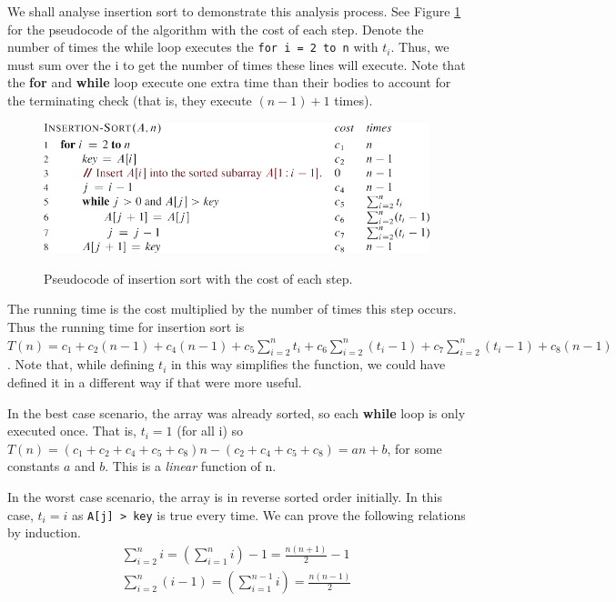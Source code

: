 \documentclass[12pt]{article}
\begin{document}
We shall analyse insertion sort to demonstrate this analysis process. See Figure \ref{Figure: insertion sort with costs} for the pseudocode
of the algorithm with the cost of each step. Denote the number of times the while loop executes the \texttt{for i = 2 to n} with $t_i$.
Thus, we must sum over the i to get the number of times these lines will execute. Note that the \textbf{for}
and \textbf{while} loop execute one extra time than their bodies to account for the terminating check (that is, they execute $(n - 1) + 1$ times).
\begin{figure}[ht]\centering\label{Figure: insertion sort with costs}
    \includegraphics[angle=0]{Figures/insertion-sort-with-costs.pdf}
    \caption{Pseudocode of insertion sort with the cost of each step.}
\end{figure}
The running time is the cost multiplied by the number of times this step occurs. Thus the running time
for insertion sort is $T(n) = c_1 + c_2(n - 1) + c_4(n - 1) + c_5\sum_{i = 2}^{n}t_i + c_6\sum_{i = 2}^{n}(t_i - 1)
+ c_7\sum_{i = 2}^{n}(t_i - 1) + c_8(n - 1)$. Note that, while defining $t_i$ in this way simplifies the function, we could have defined it in a different
way if that were more useful.

In the best case scenario, the array was already sorted, so each \textbf{while} loop is only executed
once. That is, $t_i = 1$ (for all i) so $T(n) = (c_1 + c_2 + c_4 + c_5 + c_8)n - (c_2 + c_4 + c_5 + c_8) = an + b$, for
some constants $a$ and $b$. This is a \textit{linear} function of n.

In the worst case scenario, the array is in reverse sorted order initially. In this case, $t_i = i$ as \texttt{A[j] > key} is
true every time. We can prove the following relations by induction.
\begin{eqnarray*}
    \sum_{i = 2}^{n}i = \left(\sum_{i = 1}^{n}i\right) - 1 = \frac{n(n + 1)}{2} - 1\\
    \sum_{i = 2}^{n}(i - 1) = \left(\sum_{i = 1}^{n - 1}i\right) = \frac{n(n - 1)}{2}
\end{eqnarray*}
\end{document}
